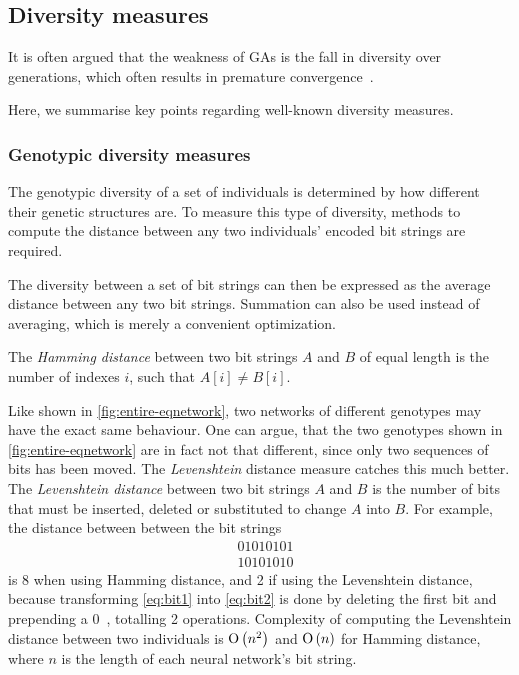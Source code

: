 \subsection{Diversity measures}
\label{sec:diversitymeasures}
It is often argued that the weakness of GAs is the fall in diversity over generations, which often results in premature convergence~\cite{diaz2007empirical, 1266373,Zitzler00comparisonof}.

Here, we summarise key points regarding well-known diversity measures. %

\subsubsection{Genotypic diversity measures}
The genotypic diversity of a set of individuals is determined by how different their genetic structures are. To measure this type of diversity, methods to compute the distance between any two individuals' encoded bit strings are required.

The diversity between a set of bit strings can then be expressed as the average distance between any two bit strings. Summation can also be used instead of averaging, which is merely a convenient optimization.

The \emph{Hamming distance} between two bit strings $A$ and $B$ of equal length is the number of indexes $i$, such that $A[i] \neq B[i]$.

Like shown in \cref{fig:entire-eqnetwork}, two networks of different genotypes may have the exact same behaviour.
One can argue, that the two genotypes shown in \cref{fig:entire-eqnetwork} are in fact not that different, since only two sequences of bits has been moved. 
The \emph{Levenshtein} distance measure catches this much better. The \emph{Levenshtein distance} between two bit strings $A$ and $B$ is the number of bits that must be inserted, deleted or substituted to change $A$ into $B$. For example, the distance between between the bit strings
%
\begin{align}
&01010101\label{eq:bit1} \\
&10101010\label{eq:bit2}
\end{align}
%
is 8 when using Hamming distance, and 2 if using the Levenshtein distance, because transforming \cref{eq:bit1} into \cref{eq:bit2} is done by deleting the first bit and prepending a $0$~\cite{1250187}, totalling 2 operations. Complexity of computing the Levenshtein distance between two individuals is $\operatorname{O}\left(n^2\right)$ and $\operatorname{O}\left(n\right)$ for Hamming distance, where $n$ is the length of each neural network's bit string.

